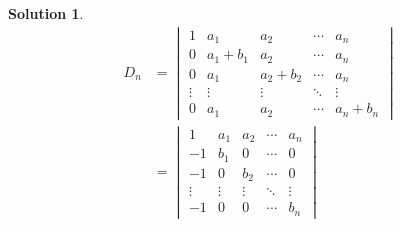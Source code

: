 \documentclass{article}
\theoremstyle{definition}
\newtheorem{solution}{Solution}[exercise]
\begin{document}
\begin{solution}
    \begin{align*}
        D_{n}
        &=
        \begin{vmatrix}
            1&a_{1}&a_{2}&\cdots&a_{n}\\
            0&a_{1}+b_{1}&a_{2}&\cdots&a_{n}\\
            0&a_{1}&a_{2}+b_{2}&\cdots&a_{n}\\
            \vdots&\vdots&\vdots&\ddots&\vdots\\
            0&a_{1}&a_{2}&\cdots&a_{n}+b_{n}
        \end{vmatrix}\\
        &=
        \begin{vmatrix}
            1&a_{1}&a_{2}&\cdots&a_{n}\\
            -1&b_{1}&0&\cdots&0\\
            -1&0&b_{2}&\cdots&0\\
            \vdots&\vdots&\vdots&\ddots&\vdots\\
            -1&0&0&\cdots&b_{n}
        \end{vmatrix}\\ 
    \end{align*}
\end{solution}
\end{document}
